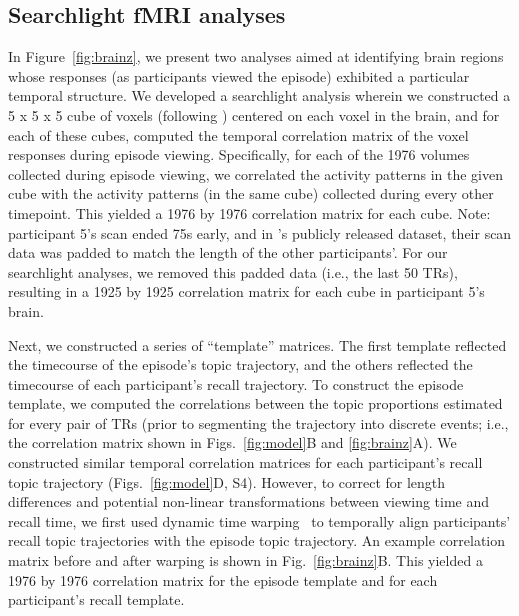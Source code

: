 \documentclass{article}
\newcommand{\corrmats}{S4}
\begin{document}
\subsection*{Searchlight fMRI analyses}
In Figure~\ref{fig:brainz}, we present two analyses aimed at identifying brain regions whose responses (as participants viewed the episode) exhibited a particular temporal structure.  We developed a searchlight analysis wherein we constructed a 5 x 5 x 5 cube of voxels (following \citealp{ChenEtal17}) centered on each voxel in the brain, and for each of these cubes, computed the temporal correlation matrix of the voxel responses during episode viewing.  Specifically, for each of the 1976 volumes collected during episode viewing, we correlated the activity patterns in the given cube with the activity patterns (in the same cube) collected during every other timepoint.  This yielded a 1976 by 1976 correlation matrix for each cube.  Note: participant 5's scan ended 75s early, and in \citealp{ChenEtal17}'s publicly released dataset, their scan data was padded to match the length of the other participants'.  For our searchlight analyses, we removed this padded data (i.e., the last 50 TRs), resulting in a 1925 by 1925 correlation matrix for each cube in participant 5's brain.

Next, we constructed a series of ``template'' matrices.  The first template reflected the timecourse of the episode's topic trajectory, and the others reflected the timecourse of each participant's recall trajectory.  To construct the episode template, we computed the correlations between the topic proportions estimated for every pair of TRs (prior to segmenting the trajectory into discrete events; i.e., the correlation matrix shown in Figs.~\ref{fig:model}B and \ref{fig:brainz}A).  We constructed similar temporal correlation matrices for each participant's recall topic trajectory (Figs.~\ref{fig:model}D, \corrmats).  However, to correct for length differences and potential non-linear transformations between viewing time and recall time, we first used dynamic time warping~\citep{BernClif94} to temporally align participants' recall topic trajectories with the episode topic trajectory.  An example correlation matrix before and after warping is shown in Fig.~\ref{fig:brainz}B.  This yielded a 1976 by 1976 correlation matrix for the episode template and for each participant's recall template.
\end{document}
